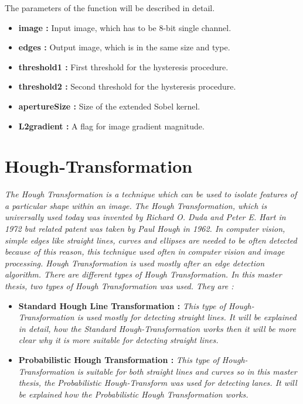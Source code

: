  The parameters of the function will be described in detail.\cite{Canny_Edge_Detector3}
 
     \begin{itemize}

\item \textbf{image : }Input image, which has to be 8-bit single channel.

\item \textbf{edges : }Output image, which is in the same size and type.

\item \textbf{threshold1 : }First threshold for the hysteresis procedure.

\item \textbf{threshold2 : }Second threshold for the hysteresis procedure.

\item \textbf{apertureSize : }Size of the extended Sobel kernel.

\item \textbf{L2gradient : }A flag for image gradient magnitude.

\end{itemize}
 
%
\section{Hough-Transformation}\label{sec:Hough-Transformation}
%
\emph{\color{red}The Hough Transformation is a technique which can be used to isolate features of a particular shape within an image.}\emph{\color{blue} The Hough Transformation, which is universally used today was invented by Richard O. Duda and Peter E. Hart in 1972 but related patent was taken by Paul Hough in 1962.\cite{Hough_Transformation} In computer vision, simple edges like straight lines, curves and ellipses are needed to be often detected because of this reason, this technique used often in computer vision and image processing. Hough Transformation is used mostly after an edge detection algorithm. There are different types of Hough Transformation. In this master thesis, two types of Hough Transformation was used. They are :}

\begin{itemize}

\item \textbf{Standard Hough Line Transformation : }\emph{\color{blue}This type of Hough-Transformation is used mostly for detecting straight lines. It will be explained in detail, how the Standard Hough-Transformation works then it will be more clear why it is more suitable for detecting straight lines.}

\item \textbf{Probabilistic Hough Transformation : }\emph{\color{blue} This type of Hough-Transformation is suitable for both straight lines and curves so in this master thesis, the Probabilistic Hough-Transform was used for detecting lanes. It will be explained how the Probabilistic Hough Transformation works.}

\end{itemize}
%
